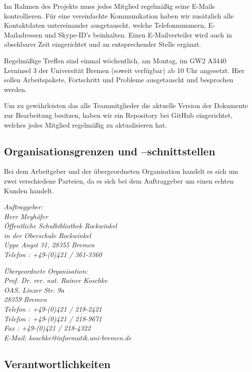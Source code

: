\documentclass[fontsize=12pt,paper=a4,twoside]{scrartcl}
\begin{document}
Im Rahmen des Projekts muss jedes Mitglied regelmäßig seine E-Mails kontrollieren. Für eine vereinfachte Kommunikation haben wir zusätzlich alle Kontaktdaten untereinander ausgetauscht, welche Telefonnummern, E-Mailadressen und Skype-ID's beinhalten. Einen E-Mailverteiler wird auch in absehbarer Zeit eingerichtet und an entsprechender Stelle ergänzt.

Regelmäßige Treffen sind einmal wöchentlich, am Montag, im GW2 A3440 Lerninsel 3 der Universität Bremen (soweit verfügbar) ab 10 Uhr angesetzt. Hier sollen Arbeitspakete, Fortschritt und Probleme ausgetauscht und besprochen werden.

Um zu gewährleisten das alle Teammitglieder die aktuelle Version der Dokumente zur Bearbeitung besitzen, haben wir ein Repository bei GitHub eingerichtet, welches jedes Mitglied regelmäßig zu aktualisieren hat.

\subsection{Organisationsgrenzen und --schnittstellen}

Bei dem Arbeitgeber und der übergeordneten Organisation handelt es sich um zwei verschiedene Parteien, da es sich bei dem Auftraggeber um einen echten Kunden handelt.

{\em Auftraggeber:\\
	Herr Meyhöfer\\
	Öffentliche Schulbibliothek Rockwinkel\\
	in der Oberschule Rockwinkel\\
	Uppe Angst 31, 28355 Bremen\\
	Telefon : +49-(0)421 / 361-3360\\
}

{\em Übergeordnete Organisation:\\ 
	Prof. Dr. rer. nat. Rainer Koschke\\
	OAS, Linzer Str. 9a\\
	28359 Bremen\\
	Telefon : +49-(0)421 / 218-2421\\
	Telefon : +49-(0)421 / 218-9671\\
	Fax : +49-(0)421 / 218-4322\\
	E-Mail: koschke@informatik.uni-bremen.de
}


\subsection{Verantwortlichkeiten}
\label{sec:verantwortlichkeiten}
\end{document}
